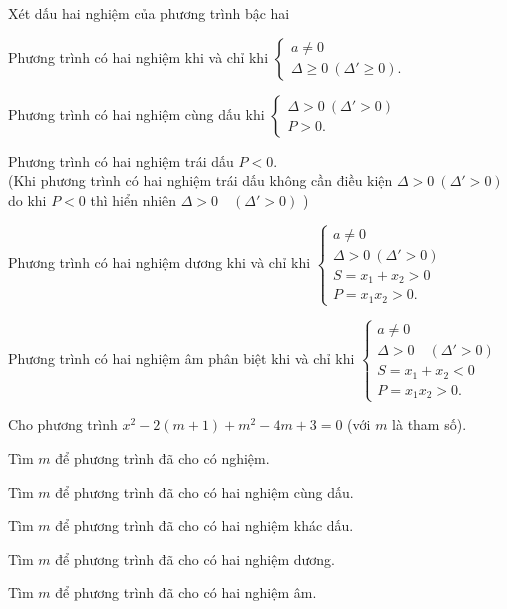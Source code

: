 	\begin{dang}{Xét dấu hai nghiệm của phương trình bậc hai}
	\begin{listEX}
		\item Phương trình có hai nghiệm  khi và chỉ khi $\begin{cases} a\ne 0\\ \Delta \ge 0\ (\Delta' \ge 0).
		\end{cases}$
		\item Phương trình có hai nghiệm cùng dấu khi $\begin{cases} 
		\Delta>0 \ (\Delta' >0)\\ P>0. \end{cases}$ 
		\item Phương trình có hai nghiệm trái dấu $P<0$.\\
		(Khi phương trình có hai nghiệm trái dấu không cần điều kiện $\Delta >0 \ (\Delta' >0)$ do khi $P < 0$ thì hiển nhiên $\Delta >0 \quad (\Delta' >0)$  )
		\item Phương trình có hai nghiệm dương khi và chỉ khi $\begin{cases} a \ne 0\\ \Delta >0 \ (\Delta' >0)\\ S= x_1+x_2>0\\ P=x_1x_2>0. \end{cases}$
		\item  Phương trình có hai nghiệm âm phân biệt khi và chỉ khi $\begin{cases} a \ne 0\\ \Delta >0 \quad (\Delta' >0)\\ S= x_1+x_2<0\\ P=x_1x_2>0. \end{cases}$
	\end{listEX}

	
		\end{dang}
		\begin{vd}
		Cho phương trình $x^2 - 2(m+1)+m^2 -4m +3=0$ (với $m$ là tham số).
		\begin{enumEX}{1}
			\item Tìm $m$ để phương trình đã cho có nghiệm.
			\item Tìm $m$ để phương trình đã cho có hai nghiệm cùng dấu.
			\item Tìm $m$ để phương trình đã cho có hai nghiệm khác dấu.
			\item Tìm $m$ để phương trình đã cho có hai nghiệm dương.
			\item Tìm $m$ để phương trình đã cho có hai nghiệm âm.
		\end{enumEX}
	\end{vd}
